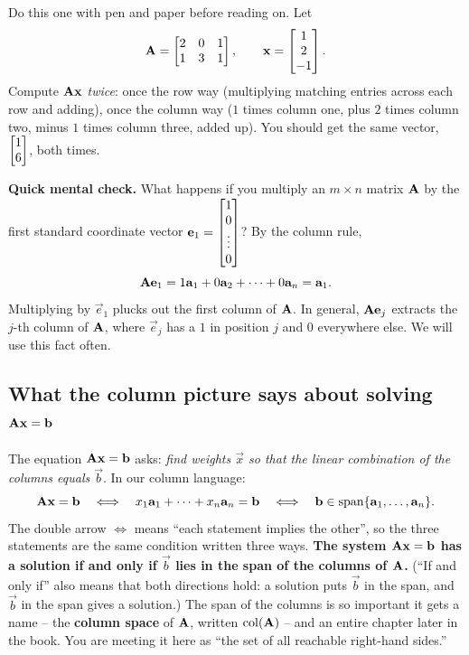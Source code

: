 \begin{labbox}
Do this one with pen and paper before reading on. Let
\[
  \mathbf{A} = \begin{bmatrix} 2 & 0 & 1 \\ 1 & 3 & 1 \end{bmatrix}, \qquad \mathbf{x} = \begin{bmatrix}1\\2\\-1\end{bmatrix}.
\]
Compute $\mathbf{A}\mathbf{x}$ \emph{twice}: once the row way (multiplying matching entries across each row and adding), once the column way ($1$ times column one, plus $2$ times column two, minus $1$ times column three, added up). You should get the same vector, $\begin{bmatrix}1\\6\end{bmatrix}$, both times.
\end{labbox}

\textbf{Quick mental check.} What happens if you multiply an $m\times n$ matrix $\mathbf{A}$ by the first standard coordinate vector $\mathbf{e}_1 = \begin{bmatrix}1\\0\\ \vdots \\ 0\end{bmatrix}$? By the column rule,
\[
  \mathbf{A}\mathbf{e}_1 = 1\mathbf{a}_1 + 0\mathbf{a}_2 + \cdots + 0\mathbf{a}_n = \mathbf{a}_1.
\]
Multiplying by $\vec{e}_1$ plucks out the first column of $\mathbf{A}$. In general, $\mathbf{A}\mathbf{e}_j$ extracts the $j$-th column of $\mathbf{A}$, where $\vec{e}_j$ has a $1$ in position $j$ and $0$ everywhere else. We will use this fact often.

\subsection{What the column picture says about solving $\mathbf{A}\mathbf{x} = \mathbf{b}$}

The equation $\mathbf{A}\mathbf{x} = \mathbf{b}$ asks: \emph{find weights $\vec{x}$ so that the linear combination of the columns equals $\vec{b}$}. In our column language:
\[
  \mathbf{A}\mathbf{x} = \mathbf{b}
  \quad\Longleftrightarrow\quad
  x_1\mathbf{a}_1 + \cdots + x_n\mathbf{a}_n = \mathbf{b}
  \quad\Longleftrightarrow\quad
  \mathbf{b} \in \operatorname{span}\{\mathbf{a}_1,\dots,\mathbf{a}_n\}.
\]
The double arrow $\Longleftrightarrow$ means ``each statement implies the other'', so the three statements are the same condition written three ways. \textbf{The system $\mathbf{A}\mathbf{x}=\mathbf{b}$ has a solution if and only if $\vec{b}$ lies in the span of the columns of $\mathbf{A}$.} (``If and only if'' also means that both directions hold: a solution puts $\vec{b}$ in the span, and $\vec{b}$ in the span gives a solution.) The span of the columns is so important it gets a name -- the \textbf{column space} of $\mathbf{A}$, written $\operatorname{col}(\mathbf{A})$ -- and an entire chapter later in the book. You are meeting it here as ``the set of all reachable right-hand sides.''

